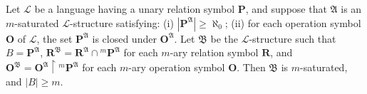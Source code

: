 Let $\mathcal{L}$ be a language having a unary relation symbol $\mathbf{P}$, and suppose that $\mathfrak{A}$ is an $m$-saturated $\mathcal{L}$-structure satisfying:
(i) $|\mathbf{P}^{\mathfrak{A}}| \geq \aleph_0$;
(ii) for each operation symbol $\mathbf{O}$ of $\mathcal{L}$, the set $\mathbf{P}^{\mathfrak{A}}$ is closed under $\mathbf{O}^{\mathfrak{A}}$.
Let $\mathfrak{B}$ be the $\mathcal{L}$-structure such that $B = \mathbf{P}^{\mathfrak{A}}$, $\mathbf{R}^{\mathfrak{B}} = \mathbf{R}^{\mathfrak{A}} \cap {}^m\mathbf{P}^{\mathfrak{A}}$ for each $m$-ary relation symbol $\mathbf{R}$, and $\mathbf{O}^{\mathfrak{B}} = \mathbf{O}^{\mathfrak{A}} \upharpoonright {}^m\mathbf{P}^{\mathfrak{A}}$ for each $m$-ary operation symbol $\mathbf{O}$. Then $\mathfrak{B}$ is $m$-saturated, and $|B| \geq m$.
